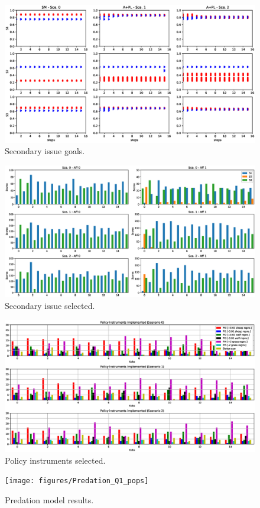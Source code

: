 \documentclass[12pt]{article}
\begin{document}
\begin{figure}
\centering
\includegraphics[width = 0.95\linewidth, angle = 0]{figures/PE_PL_SGoals}
\caption{Secondary issue goals.}
\label{fig:PE_PL_SGoals}
\end{figure}

\begin{figure}
\centering
\includegraphics[width = 0.95\linewidth, angle = 0]{figures/PE_PL_SSelected}
\caption{Secondary issue selected.}
\label{fig:PE_PL_SSelected}
\end{figure}

\begin{figure}
\centering
\includegraphics[width = 0.95\linewidth, angle = 0]{figures/PE_PI_selection}
\caption{Policy instruments selected.}
\label{fig:PE_PI_selection}
\end{figure}

\begin{figure}
\centering
\texttt{[image: figures/Predation\_Q1\_pops]}
\caption{Predation model results.}
\label{fig:Predation_Q1_pops}
\end{figure}



 

\end{document}
